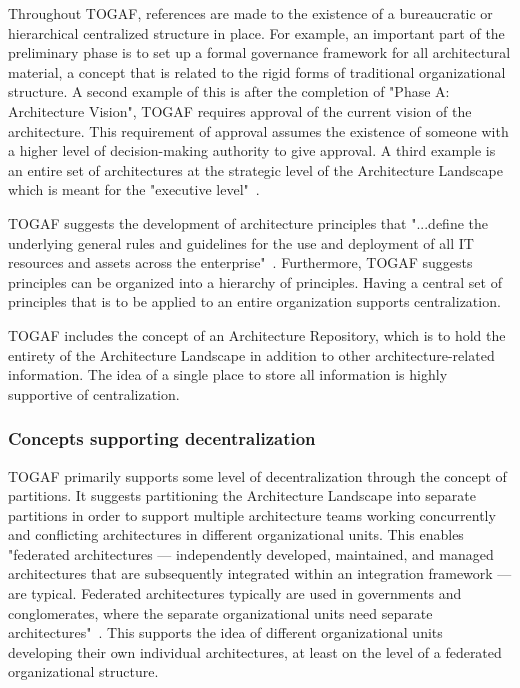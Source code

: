 Throughout TOGAF, references are made to the existence of a bureaucratic or hierarchical centralized structure in place. For example, an important part of the preliminary phase is to set up a formal governance framework for all architectural material, a concept that is related to the rigid forms of traditional organizational structure. A second example of this is after the completion of "Phase A: Architecture Vision", TOGAF requires approval of the current vision of the architecture. This requirement of approval assumes the existence of someone with a higher level of decision-making authority to give approval. A third example is an entire set of architectures at the strategic level of the Architecture Landscape which is meant for the "executive level"~\cite{togaf9.1}.

TOGAF suggests the development of architecture principles that "...define the underlying general rules and guidelines for the use and
deployment of all IT resources and assets across the enterprise"~\cite{togaf9.1}. Furthermore, TOGAF suggests principles can be organized into a hierarchy of principles. Having a central set of principles that is to be applied to an entire organization supports centralization.

TOGAF includes the concept of an Architecture Repository, which is to hold the entirety of the Architecture Landscape in addition to other architecture-related information. The idea of a single place to store all information is highly supportive of centralization. 

\subsubsection{Concepts supporting decentralization}

TOGAF primarily supports some level of decentralization through the concept of partitions. It suggests partitioning the Architecture Landscape into separate partitions in order to support multiple architecture teams working concurrently and conflicting architectures in different organizational units. This enables "federated architectures — independently developed, maintained, and managed architectures that are subsequently integrated within an integration framework — are typical. Federated architectures typically are used in governments and conglomerates, where the separate organizational units need separate architectures"~\cite{togaf9.1}. This supports the idea of different organizational units developing their own individual architectures, at least on the level of a federated organizational structure. 

